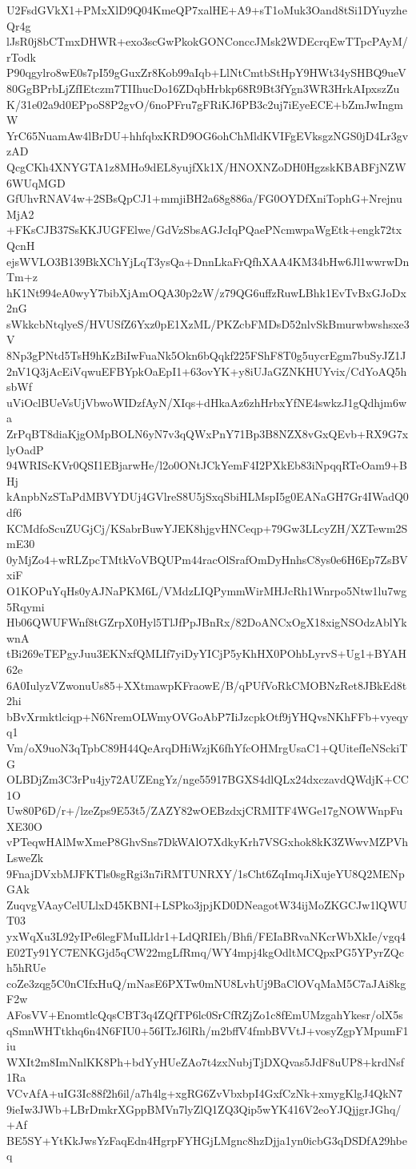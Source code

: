 U2FsdGVkX1+PMxXlD9Q04KmeQP7xalHE+A9+sT1oMuk3Oand8tSi1DYuyzheQr4g
lJsR0j8bCTmxDHWR+exo3scGwPkokGONConccJMsk2WDEcrqEwTTpcPAyM/rTodk
P90qgylro8wE0s7pI59gGuxZr8Kob99aIqb+LlNtCmtbStHpY9HWt34ySHBQ9ueV
80GgBPrbLjZfIEtczm7TIIhucDo16ZDqbHrbkp68R9Bt3fYgn3WR3HrkAIpxszZu
K/31e02a9d0EPpoS8P2gvO/6noPFru7gFRiKJ6PB3c2uj7iEyeECE+bZmJwIngmW
YrC65NuamAw4lBrDU+hhfqbxKRD9OG6ohChMldKVIFgEVksgzNGS0jD4Lr3gvzAD
QcgCKh4XNYGTA1z8MHo9dEL8yujfXk1X/HNOXNZoDH0HgzskKBABFjNZW6WUqMGD
GfUhvRNAV4w+2SBsQpCJ1+mmjiBH2a68g886a/FG0OYDfXniTophG+NrejnuMjA2
+FKsCJB37SsKKJUGFElwe/GdVzSbsAGJcIqPQaePNcmwpaWgEtk+engk72txQcnH
ejsWVLO3B139BkXChYjLqT3ysQa+DnnLkaFrQfhXAA4KM34bHw6Jl1wwrwDnTm+z
hK1Nt994eA0wyY7bibXjAmOQA30p2zW/z79QG6uffzRuwLBhk1EvTvBxGJoDx2nG
sWkkcbNtqlyeS/HVUSfZ6Yxz0pE1XzML/PKZcbFMDsD52nlvSkBmurwbwshsxe3V
8Np3gPNtd5TsH9hKzBiIwFuaNk5Okn6bQqkf225FShF8T0g5uycrEgm7buSyJZ1J
2nV1Q3jAcEiVqwuEFBYpkOaEpI1+63ovYK+y8iUJaGZNKHUYvix/CdYoAQ5hsbWf
uViOclBUeVsUjVbwoWIDzfAyN/XIqs+dHkaAz6zhHrbxYfNE4swkzJ1gQdhjm6wa
ZrPqBT8diaKjgOMpBOLN6yN7v3qQWxPnY71Bp3B8NZX8vGxQEvb+RX9G7xlyOadP
94WRIScKVr0QSI1EBjarwHe/l2o0ONtJCkYemF4I2PXkEb83iNpqqRTeOam9+BHj
kAnpbNzSTaPdMBVYDUj4GVlreS8U5jSxqSbiHLMspI5g0EANaGH7Gr4IWadQ0df6
KCMdfoScuZUGjCj/KSabrBuwYJEK8hjgvHNCeqp+79Gw3LLcyZH/XZTewm2SmE30
0yMjZo4+wRLZpcTMtkVoVBQUPm44racOlSrafOmDyHnhsC8ys0e6H6Ep7ZsBVxiF
O1KOPuYqHs0yAJNaPKM6L/VMdzLIQPymmWirMHJcRh1Wnrpo5Ntw1lu7wg5Rqymi
Hb06QWUFWnf8tGZrpX0Hyl5TlJfPpJBnRx/82DoANCxOgX18xigNSOdzAblYkwnA
tBi269eTEPgyJuu3EKNxfQMLIf7yiDyYICjP5yKhHX0POhbLyrvS+Ug1+BYAH62e
6A0IulyzVZwonuUs85+XXtmawpKFraowE/B/qPUfVoRkCMOBNzRet8JBkEd8t2hi
bBvXrmktlciqp+N6NremOLWmyOVGoAbP7IiJzcpkOtf9jYHQvsNKhFFb+vyeqyq1
Vm/oX9uoN3qTpbC89H44QeArqDHiWzjK6fhYfcOHMrgUsaC1+QUitefIeNSckiTG
OLBDjZm3C3rPu4jy72AUZEngYz/nge55917BGXS4dlQLx24dxczavdQWdjK+CC1O
Uw80P6D/r+/lzeZps9E53t5/ZAZY82wOEBzdxjCRMITF4WGe17gNOWWnpFuXE30O
vPTeqwHAlMwXmeP8GhvSns7DkWAlO7XdkyKrh7VSGxhok8kK3ZWwvMZPVhLsweZk
9FnajDVxbMJFKTls0sgRgi3n7iRMTUNRXY/1sCht6ZqImqJiXujeYU8Q2MENpGAk
ZuqvgVAayCelULlxD45KBNI+LSPko3jpjKD0DNeagotW34ijMoZKGCJw1lQWUT03
yxWqXu3L92yIPe6legFMuILldr1+LdQRIEh/Bhfi/FEIaBRvaNKcrWbXkIe/vgq4
E02Ty91YC7ENKGjd5qCW22mgLfRmq/WY4mpj4kgOdltMCQpxPG5YPyrZQch5hRUe
coZe3zqg5C0nCIfxHuQ/mNasE6PXTw0mNU8LvhUj9BaClOVqMaM5C7aJAi8kgF2w
AFosVV+EnomtlcQqsCBT3q4ZQfTP6lc0SrCfRZjZo1c8fEmUMzgahYkesr/olX5s
qSmnWHTtkhq6n4N6FIU0+56ITzJ6lRh/m2bffV4fmbBVVtJ+vosyZgpYMpumF1iu
WXIt2m8ImNnlKK8Ph+bdYyHUeZAo7t4zxNubjTjDXQvas5JdF8uUP8+krdNsf1Ra
VCvAfA+uIG3Ic88f2h6il/a7h4lg+xgRG6ZvVbxbpI4GxfCzNk+xmygKlgJ4QkN7
9ieIw3JWb+LBrDmkrXGppBMVn7lyZlQ1ZQ3Qip5wYK416V2eoYJQjjgrJGhq/+Af
BE5SY+YtKkJwsYzFaqEdn4HgrpFYHGjLMgnc8hzDjja1yn0icbG3qDSDfA29hbeq
